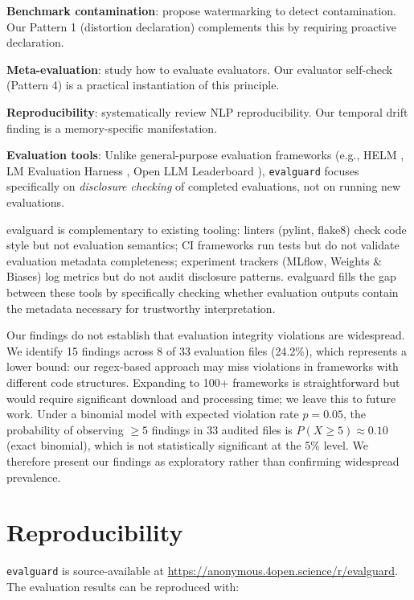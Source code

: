 \documentclass[11pt]{article}
\begin{document}
\textbf{Benchmark contamination}: \citet{benchmark_contamination_1} propose watermarking to detect contamination. Our Pattern 1 (distortion declaration) complements this by requiring proactive declaration.

\textbf{Meta-evaluation}: \citet{gu2024judgesurvey} study how to evaluate evaluators. Our evaluator self-check (Pattern 4) is a practical instantiation of this principle.

\textbf{Reproducibility}: \citet{belz2021reproducibility} systematically review NLP reproducibility. Our temporal drift finding is a memory-specific manifestation.

\textbf{Evaluation tools}: Unlike general-purpose evaluation frameworks (e.g., HELM \citep{liang2023helm}, LM Evaluation Harness \citep{gao2024lmeval}, Open LLM Leaderboard \citep{openllm2024}), \texttt{evalguard} focuses specifically on \emph{disclosure checking} of completed evaluations, not on running new evaluations.

evalguard is complementary to existing tooling: linters (pylint, flake8) check code style but not evaluation semantics; CI frameworks run tests but do not validate evaluation metadata completeness; experiment trackers (MLflow, Weights \& Biases) log metrics but do not audit disclosure patterns. evalguard fills the gap between these tools by specifically checking whether evaluation outputs contain the metadata necessary for trustworthy interpretation.



Our findings do not establish that evaluation integrity violations are widespread. We identify 15 findings across 8 of 33 evaluation files (24.2\%), which represents a lower bound: our regex-based approach may miss violations in frameworks with different code structures. Expanding to 100+ frameworks is straightforward but would require significant download and processing time; we leave this to future work. Under a binomial model with expected violation rate $p = 0.05$, the probability of observing $\geq 5$ findings in 33 audited files is $P(X \geq 5) \approx 0.10$ (exact binomial), which is not statistically significant at the 5\% level. We therefore present our findings as exploratory rather than confirming widespread prevalence.


\section{Reproducibility}
\label{sec:repro}

\texttt{evalguard} is source-available at \url{https://anonymous.4open.science/r/evalguard}. The evaluation results can be reproduced with:
\end{document}
